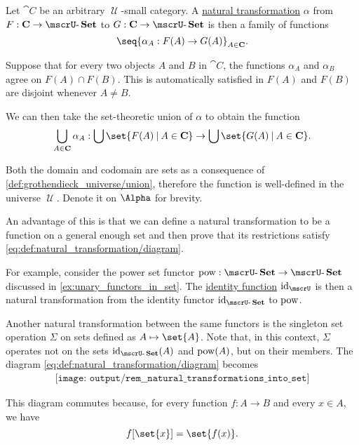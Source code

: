 \begin{remark}\label{rem:natural_transformations_into_set}
  Let \( \cat{C} \) be an arbitrary \( \mscrU \)-small category. A \hyperref[def:natural_transformation]{natural transformation} \( \alpha \) from \( F: \cat{C} \to \ucat{Set} \) to \( G: \cat{C} \to \ucat{Set} \) is then a family of functions
  \begin{equation*}
    \seq{ \alpha_A: F(A) \to G(A) }_{A \in \cat{C}}.
  \end{equation*}

  Suppose that for every two objects \( A \) and \( B \) in \( \cat{C} \), the functions \( \alpha_A \) and \( \alpha_B \) agree on \( F(A) \cap F(B) \). This is automatically satisfied in \( F(A) \) and \( F(B) \) are disjoint whenever \( A \neq B \).

  We can then take the set-theoretic union of \( \alpha \) to obtain the function
  \begin{equation*}
    \bigcup_{A \in \cat{C}} \alpha_A: \bigcup\set{ F(A) \given A \in \cat{C} } \to \bigcup\set{ G(A) \given A \in \cat{C} }.
  \end{equation*}

  Both the domain and codomain are sets as a consequence of \ref{def:grothendieck_universe/union}, therefore the function is well-defined in the universe \( \mscrU \). Denote it on \( \Alpha \) for brevity.

  An advantage of this is that we can define a natural transformation to be a function on a general enough set and then prove that its restrictions satisfy \eqref{eq:def:natural_transformation/diagram}.

  For example, consider the power set functor \( \pow: \ucat{Set} \to \ucat{Set} \) discussed in \cref{ex:unary_functors_in_set}. The \hyperref[def:set_valued_map/identity]{identity function} \( \id_\mscrU \) is then a natural transformation from the identity functor \( \id_{\ucat{Set}} \) to \( \operatorname{pow} \).

  Another natural transformation between the same functors is the singleton set operation \( \Sigma \) on sets defined as \( A \mapsto \set{ A } \). Note that, in this context, \( \Sigma \) operates not on the sets \( \id_{\ucat{Set}}(A) \) and \( \operatorname{pow}(A) \), but on their members. The diagram \eqref{eq:def:natural_transformation/diagram} becomes
  \begin{equation}\label{eq:rem:natural_transformations_into_set}
    \begin{aligned}
      \texttt{[image: output/rem\_\_natural\_transformations\_into\_set]}
    \end{aligned}
  \end{equation}

  This diagram commutes because, for every function \( f: A \to B \) and every \( x \in A \), we have
  \begin{equation*}
    f[\set{ x }] = \set{ f(x) }.
  \end{equation*}
\end{remark}


